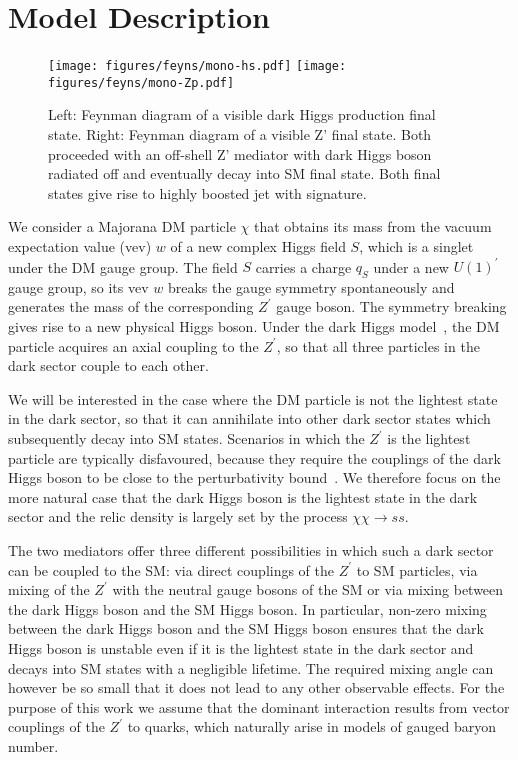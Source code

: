 \section{Model Description \label{sec:model}}

\begin{figure}[htbp]
   \centering
   \texttt{[image: figures/feyns/mono-hs.pdf]}
   \texttt{[image: figures/feyns/mono-Zp.pdf]}
   \caption{Left: Feynman diagram of a visible dark Higgs production final state. Right: Feynman diagram of a visible Z' final state. Both proceeded with an off-shell Z' mediator with dark Higgs boson radiated off and eventually decay into SM final state. Both final states give rise to highly boosted jet with \MET signature.}
   \label{fig:feynman}
\end{figure}

We consider a Majorana DM particle $\chi$ that obtains its mass from the vacuum expectation value (vev) $w$ of a new complex Higgs field $S$, which is a singlet under the DM gauge group. The field $S$ carries a charge $q_{S}$ under a new $U(1)^{\prime}$ gauge group, so its vev $w$ breaks the gauge symmetry spontaneously and generates the mass of the corresponding $Z^{\prime}$ gauge boson. The symmetry breaking gives rise to a new physical Higgs boson. Under the dark Higgs model~\cite{Duerr2017}, the DM particle acquires an axial coupling to the $Z^{\prime}$, so that all three particles in the dark sector couple to each other.

We will be interested in the case where the DM particle is not the lightest state in the
dark sector, so that it can annihilate into other dark sector states which subsequently decay
into SM states. Scenarios in which the $Z^{\prime}$ is the lightest particle are typically disfavoured,
because they require the couplings of the dark Higgs boson to be close to the perturbativity
bound~\cite{Bai2015,PhysRevD.92.035007}. We therefore focus on the more natural case that the dark Higgs boson is the
lightest state in the dark sector and the relic density is largely set by the process $\chi\chi\rightarrow ss$.

The two mediators offer three different possibilities in which such a dark sector can
be coupled to the SM: via direct couplings of the $Z^{\prime}$
to SM particles, via mixing of the $Z^{\prime}$ with the neutral gauge bosons of the SM or via mixing between the dark Higgs boson and
the SM Higgs boson. In particular, non-zero mixing between the dark Higgs boson
and the SM Higgs boson ensures that the dark Higgs boson is unstable even if it is the
lightest state in the dark sector and decays into SM states with a negligible lifetime. The
required mixing angle can however be so small that it does not lead to any other observable
effects. For the purpose of this work we assume that the dominant interaction results from
vector couplings  of the $Z^{\prime}$ to quarks, which naturally arise in models of gauged baryon
number. 

